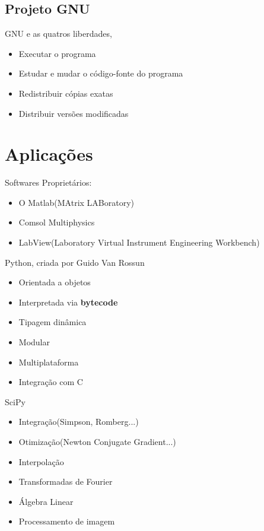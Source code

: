 \documentclass{beamer}
\begin{document}
\subsection{Projeto GNU}

\begin{frame}
    GNU e as quatros liberdades,
    \begin{itemize}
        \item Executar o programa
        \item Estudar e mudar o código-fonte do programa
        \item Redistribuir cópias exatas
        \item Distribuir versões modificadas
    \end{itemize}
\end{frame}

\section{Aplicações}

\begin{frame}
    Softwares Proprietários:
    \begin{itemize}
    \item O Matlab(MAtrix LABoratory)
    \item Comsol Multiphysics
    \item LabView(Laboratory Virtual Instrument Engineering Workbench)
    \end{itemize}
\end{frame}

\begin{frame}
    Python, criada por Guido Van Rossun
    \begin{itemize}
        \item Orientada a objetos
        \item Interpretada via \textbf{bytecode}
        \item Tipagem dinâmica
        \item Modular
        \item Multiplataforma
        \item Integração com C
    \end{itemize}
\end{frame}

\begin{frame}
    SciPy
    \begin{itemize}
        \item Integração(Simpson, Romberg...)
        \item Otimização(Newton Conjugate Gradient...)
        \item Interpolação
        \item Transformadas de Fourier
        \item Álgebra Linear
        \item Processamento de imagem
    \end{itemize}
\end{frame}
\end{document}
